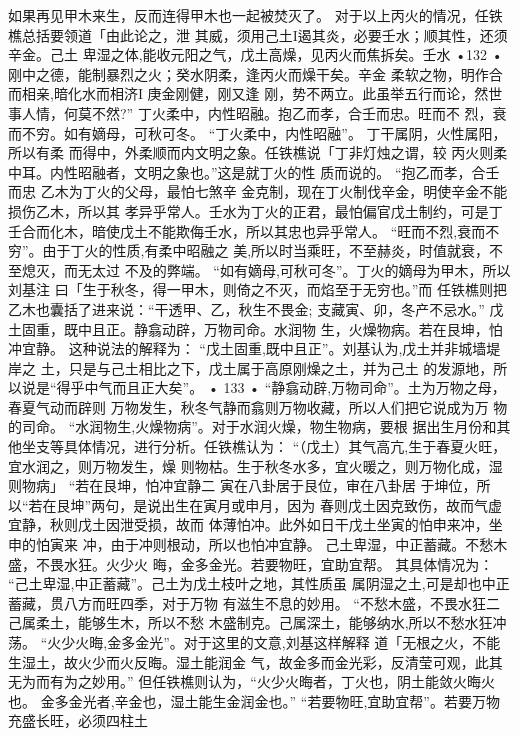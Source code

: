 如果再见甲木来生，反而连得甲木也一起被焚灭了。
对于以上丙火的情况，任铁樵总括要领道「由此论之，泄
其威，须用己土I遏其炎，必要壬水；顺其性，还须辛金。己土
卑湿之体,能收元阳之气，戊土高燥，见丙火而焦拆矣。壬水
•132 •
刚中之德，能制暴烈之火；癸水阴柔，逢丙火而燥干矣。辛金
柔软之物，明作合而相亲,暗化水而相济I 庚金刚健，刚又逢
刚，势不两立。此虽举五行而论，然世事人情，何莫不然?”
丁火柔中，内性昭融。抱乙而孝，合壬而忠。旺而不
烈，衰而不穷。如有嫡母，可秋可冬。
“丁火柔中，内性昭融”。 丁干属阴，火性属阳，所以有柔
而得中，外柔顺而内文明之象。任铁樵说「丁非灯烛之谓，较
丙火则柔中耳。内性昭融者，文明之象也。”这是就丁火的性
质而说的。
“抱乙而孝，合壬而忠 乙木为丁火的父母，最怕七煞辛
金克制，现在丁火制伐辛金，明使辛金不能损伤乙木，所以其
孝异乎常人。壬水为丁火的正君，最怕偏官戊土制约，可是丁
壬合而化木，暗使戊土不能欺侮壬水，所以其忠也异乎常人。
“旺而不烈,衰而不穷”。由于丁火的性质,有柔中昭融之
美,所以时当乘旺，不至赫炎，时值就衰，不至熄灭，而无太过
不及的弊端。
“如有嫡母,可秋可冬”。丁火的嫡母为甲木，所以刘基注
曰「生于秋冬，得一甲木，则倚之不灭，而焰至于无穷也。”而
任铁樵则把乙木也囊括了进来说：“干透甲、乙，秋生不畏金;
支藏寅、卯，冬产不忌水。”
戊土固重，既中且正。静翕动辟，万物司命。水润物
生，火燥物病。若在艮坤，怕冲宜静。
这种说法的解释为：
“戊土固重,既中且正”。刘基认为,戊土并非城墙堤岸之
土，只是与己土相比之下，戊土属于高原刚燥之土，并为己土
的发源地，所以说是“得乎中气而且正大矣”。
• 133 •
“静翕动辟,万物司命”。土为万物之母，春夏气动而辟则
万物发生，秋冬气静而翕则万物收藏，所以人们把它说成为万
物的司命。
“水润物生,火燥物病”。对于水润火燥，物生物病，要根
据出生月份和其他坐支等具体情况，进行分析。任铁樵认为：
“（戊土）其气高亢,生于春夏火旺，宜水润之，则万物发生，燥
则物枯。生于秋冬水多，宜火暖之，则万物化成，湿则物病」
“若在艮坤，怕冲宜静二 寅在八卦居于艮位，审在八卦居
于坤位，所以“若在艮坤”两句，是说出生在寅月或申月，因为
春则戊土因克致伤，故而气虚宜静，秋则戊土因泄受损，故而
体薄怕冲。此外如日干戊土坐寅的怕申来冲，坐申的怕寅来
冲，由于冲则根动，所以也怕冲宜静。
己土卑湿，中正蓄藏。不愁木盛，不畏水狂。火少火
晦，金多金光。若要物旺，宜助宜帮。
其具体情况为：
“己土卑湿,中正蓄藏”。己土为戊土枝叶之地，其性质虽
属阴湿之土,可是却也中正蓄藏，贯八方而旺四季，对于万物
有滋生不息的妙用。
“不愁木盛，不畏水狂二 己属柔土，能够生木，所以不愁
木盛制克。己属深土，能够纳水,所以不愁水狂冲荡。
“火少火晦,金多金光”。对于这里的文意,刘基这样解释
道「无根之火，不能生湿土，故火少而火反晦。湿土能润金
气，故金多而金光彩，反清莹可观，此其无为而有为之妙用。”
但任铁樵则认为，“火少火晦者，丁火也，阴土能敛火晦火也。
金多金光者,辛金也，湿土能生金润金也。”
“若要物旺,宜助宜帮”。若要万物充盛长旺，必须四柱土

